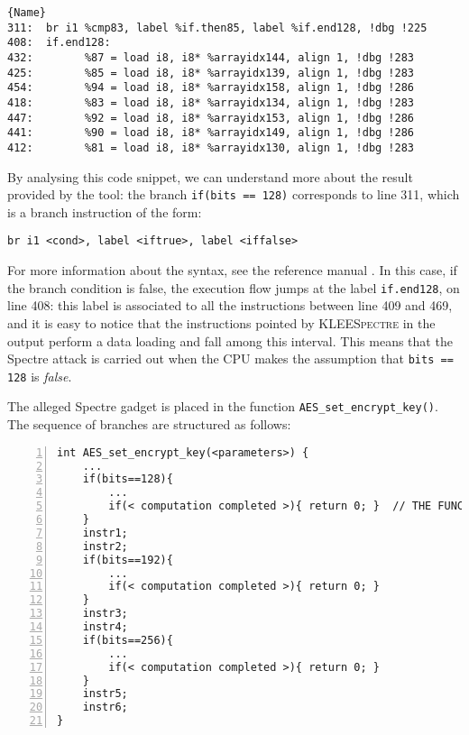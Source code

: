 \documentclass[target=mst,aauheader=aics]{thud}
\theoremstyle{definition}
\begin{document}
    \begin{minipage}{\textwidth}
	\begin{lstlisting}[caption=\texttt{assembly.ll} (for AES-CBC), label=asm1, numbers=none]{Name}
311:  br i1 %cmp83, label %if.then85, label %if.end128, !dbg !225
408:  if.end128:                                        
432:  		%87 = load i8, i8* %arrayidx144, align 1, !dbg !283
425:  		%85 = load i8, i8* %arrayidx139, align 1, !dbg !283
454:  		%94 = load i8, i8* %arrayidx158, align 1, !dbg !286
418:  		%83 = load i8, i8* %arrayidx134, align 1, !dbg !283
447:  		%92 = load i8, i8* %arrayidx153, align 1, !dbg !286
441:  		%90 = load i8, i8* %arrayidx149, align 1, !dbg !286
412:  		%81 = load i8, i8* %arrayidx130, align 1, !dbg !283
	\end{lstlisting}
	\end{minipage}
	\vspace{3mm}
	
	By analysing this code snippet, we can understand more about the result provided by the tool: the branch \texttt{if(bits == 128)} corresponds to line 311, which is a branch instruction of the form:
	
	\begin{lstlisting}[frame=none, numbers=none]
	br i1 <cond>, label <iftrue>, label <iffalse>
	\end{lstlisting}

	For more information about the syntax, see the reference manual \cite{LLVMasm}. In this case, if the branch condition is false, the execution flow jumps at the label \texttt{if.end128}, on line 408: this label is associated to all the instructions between line 409 and 469, and it is easy to notice that the instructions pointed by \textsc{KLEESpectre} in the output perform a data loading and fall among this interval. This means that the Spectre attack is carried out when the CPU makes the assumption that \texttt{bits == 128} is \textit{false}. 
	
	The alleged Spectre gadget is placed in the function \texttt{AES\_set\_encrypt\_key()}. The sequence of branches are structured as follows:
	
	\begin{lstlisting}[numbers=left]
int AES_set_encrypt_key(<parameters>) {
	...
	if(bits==128){
		...
		if(< computation completed >){ return 0; }	// THE FUNCTION RETURNS
	}
	instr1;
	instr2;
	if(bits==192){
		...
		if(< computation completed >){ return 0; }
	}
	instr3;
	instr4;
	if(bits==256){
		...
		if(< computation completed >){ return 0; }
	}
	instr5;
	instr6;
}
	\end{lstlisting}
	
\end{document}
